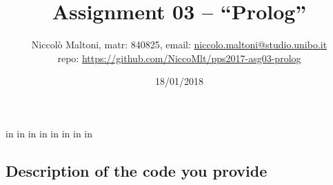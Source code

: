  in %
     in
     in      %
     in      %
     in
     in       %
     in
     in
    
\title{\vspace{-70pt}Assignment 03 -- ``Prolog''}
\author{Niccolò Maltoni, matr: 840825, email: {\href{mailto:niccolo.maltoni@studio.unibo.it}{niccolo.maltoni@studio.unibo.it}}\\ repo: {\url{https://github.com/NiccoMlt/pps2017-asg03-prolog}}}
\date{18/01/2018}




    \maketitle
    \vspace{-30pt}

    \subsection*{Description of the code you provide}

